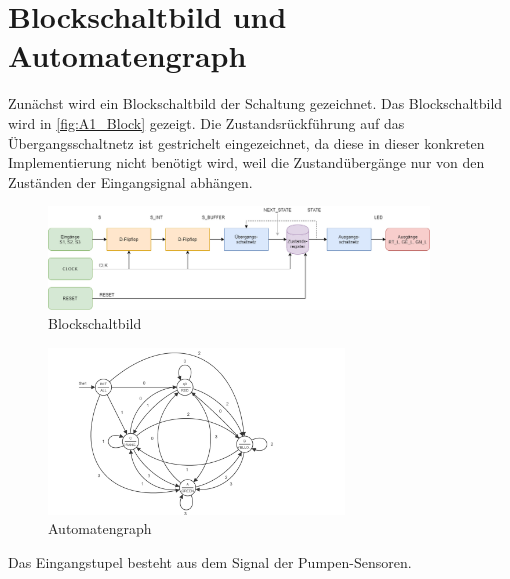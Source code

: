 \section{Blockschaltbild und Automatengraph}

Zunächst wird ein Blockschaltbild der Schaltung gezeichnet. Das Blockschaltbild wird in \autoref{fig:A1_Block} gezeigt. Die Zustandsrückführung auf das Übergangsschaltnetz ist gestrichelt eingezeichnet, da diese in dieser konkreten Implementierung nicht benötigt wird, weil die Zustandübergänge nur von den Zuständen der Eingangsignal abhängen.

\begin{figure}[H]
    \begin{center}
        \includegraphics[width=0.9\textwidth]{img/Blockschalt1.png}
        \caption{Blockschaltbild}
        \label{fig:A1_Block}
    \end{center}
\end{figure}


\begin{figure}[H]
    \begin{center}
        \includegraphics[width=0.7\textwidth]{img/test (2).png}
        \caption{Automatengraph}
        \label{fig:A1_Auto}
    \end{center}
\end{figure}

Das Eingangstupel besteht aus dem Signal der Pumpen-Sensoren. 
 
